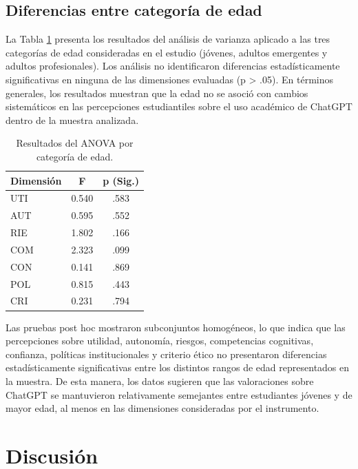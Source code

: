 \documentclass[spanish]{textolivre}
\begin{document}
\subsection{Diferencias entre categoría de edad}

La Tabla \ref{tab5} presenta los resultados del análisis de varianza aplicado a las tres categorías de edad consideradas en el estudio (jóvenes, adultos emergentes y adultos profesionales). Los análisis no identificaron diferencias estadísticamente significativas en ninguna de las dimensiones evaluadas (p > .05). En términos generales, los resultados muestran que la edad no se asoció con cambios sistemáticos en las percepciones estudiantiles sobre el uso académico de ChatGPT dentro de la muestra analizada.

\begin{table}[htbp]
\centering
\begin{threeparttable}
\caption{Resultados del ANOVA por categoría de edad.}
\label{tab5}
\begin{tabular}{lcc}
\toprule
Dimensión & F & p (Sig.) \\ 
\midrule
UTI & 0.540 & .583 \\
AUT & 0.595 & .552 \\
RIE & 1.802 & .166 \\
COM & 2.323 & .099 \\
CON & 0.141 & .869 \\
POL & 0.815 & .443 \\
CRI & 0.231 & .794 \\
\bottomrule
\end{tabular}
\vspace{6pt}
\end{threeparttable}
\end{table}

Las pruebas post hoc mostraron subconjuntos homogéneos, lo que indica que las percepciones sobre utilidad, autonomía, riesgos, competencias cognitivas, confianza, políticas institucionales y criterio ético no presentaron diferencias estadísticamente significativas entre los distintos rangos de edad representados en la muestra. De esta manera, los datos sugieren que las valoraciones sobre ChatGPT se mantuvieron relativamente semejantes entre estudiantes jóvenes y de mayor edad, al menos en las dimensiones consideradas por el instrumento.

\section{Discusión}
\end{document}
